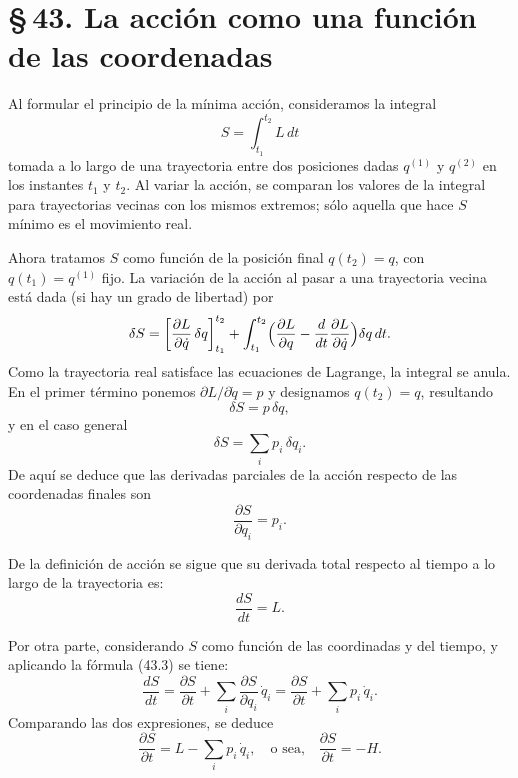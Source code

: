 \documentclass[12pt]{article}
\begin{document}
\section*{\S\,43. La acción como una función de las coordenadas}

Al formular el principio de la mínima acción, consideramos la integral
\begin{equation}
S=\int_{t_1}^{t_2}L\,dt
\tag{43.1}
\end{equation}
tomada a lo largo de una trayectoria entre dos posiciones dadas $q^{(1)}$ y $q^{(2)}$ en los instantes $t_1$ y $t_2$. Al variar la acción, se comparan los valores de la integral para trayectorias vecinas con los mismos extremos; sólo aquella que hace $S$ mínimo es el movimiento real.

Ahora tratamos $S$ como función de la posición final $q(t_2)=q$, con $q(t_1)=q^{(1)}$ fijo. La variación de la acción al pasar a una trayectoria vecina está dada (si hay un grado de libertad) por
\[
\delta S
=\biggl[\frac{\partial L}{\partial\dot q}\,\delta q\biggr]_{t_1}^{t_2}
+\int_{t_1}^{t_2}\Bigl(\frac{\partial L}{\partial q}
-\frac{d}{dt}\frac{\partial L}{\partial\dot q}\Bigr)\delta q\,dt.
\]
Como la trayectoria real satisface las ecuaciones de Lagrange, la integral se anula. En el primer término ponemos $\partial L/\partial\dot q=p$ y designamos $q(t_2)=q$, resultando
\begin{equation}
\delta S = p\,\delta q,
\tag{43.2}
\end{equation}
y en el caso general
\begin{equation}
\delta S = \sum_i p_i\,\delta q_i.
\tag{43.2}
\end{equation}
De aquí se deduce que las derivadas parciales de la acción respecto de las coordenadas finales son
\begin{equation}
\frac{\partial S}{\partial q_i}=p_i.
\tag{43.3}
\end{equation}

De la definición de acción se sigue que su derivada total respecto al tiempo a lo largo de la trayectoria es:
\[
\frac{dS}{dt}=L.
\tag{43.4}
\]

Por otra parte, considerando \(S\) como función de las coordinadas y del tiempo, y aplicando la fórmula (43.3) se tiene:
\[
\frac{dS}{dt}
=\frac{\partial S}{\partial t}
+\sum_i\frac{\partial S}{\partial q_i}\,\dot q_i
=\frac{\partial S}{\partial t}
+\sum_i p_i\,\dot q_i.
\]
Comparando las dos expresiones, se deduce
\[
\frac{\partial S}{\partial t}
= L - \sum_i p_i\,\dot q_i,
\quad\text{o sea,}\quad
\frac{\partial S}{\partial t} = -H.
\tag{43.5}
\]
\end{document}

